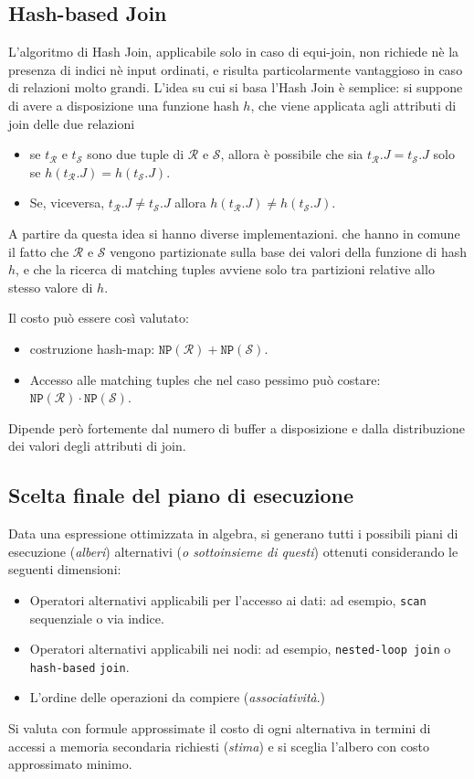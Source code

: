 \documentclass[oneside,a4paper,11pt]{book}
\theoremstyle{italicstyle}
\theoremstyle{normStyle}
\begin{document}
\subsection{Hash-based Join}
L'algoritmo di Hash Join, applicabile solo in caso di equi-join, non richiede nè la presenza di 
indici nè input ordinati, e risulta particolarmente vantaggioso in caso di relazioni molto grandi.
L'idea su cui si basa l'Hash Join è semplice:
si suppone di avere a disposizione una funzione hash $h$, che viene applicata agli attributi di join 
delle due relazioni
\begin{itemize}
  \item se $t_\mathcal{R}$ e $t_\mathcal{S}$ sono due tuple di $\mathcal{R}$ e 
  $\mathcal{S}$, allora è possibile che sia $t_\mathcal{R}.J = t_\mathcal{S}.J$
  solo se $h(t_\mathcal{R}.J) = h(t_\mathcal{S}.J)$.
  \item Se, viceversa, $t_\mathcal{R}.J \not= t_\mathcal{S}.J$
  allora $h(t_\mathcal{R}.J) \not= h(t_\mathcal{S}.J)$.
\end{itemize}
A partire da questa idea si hanno diverse implementazioni. che hanno in comune il fatto che $\mathcal{R}$ e 
$\mathcal{S}$ vengono partizionate sulla base dei valori della funzione di hash $h$, e che 
la ricerca di matching tuples avviene solo tra partizioni relative allo stesso valore di $h$.

Il costo può essere così valutato:
\begin{itemize}
  \item costruzione hash-map: $\texttt{NP}(\mathcal{R}) + \texttt{NP}(\mathcal{S})$.
  \item Accesso alle matching tuples che nel  caso pessimo può costare: $\texttt{NP}(\mathcal{R}) \cdot \texttt{NP}(\mathcal{S})$.
\end{itemize}
Dipende però fortemente dal numero di buffer a disposizione e dalla distribuzione dei valori degli attributi di join.
\subsection{Scelta finale del piano di esecuzione}
Data una espressione ottimizzata in algebra, si generano tutti i possibili piani di esecuzione (\textit{alberi}) 
alternativi (\textit{o sottoinsieme di questi}) ottenuti considerando le seguenti dimensioni:
\begin{itemize}
  \item Operatori alternativi applicabili per l'accesso ai dati: ad esempio, \verb|scan| sequenziale o via indice.
  \item Operatori alternativi applicabili nei nodi: ad esempio, \verb|nested-loop join| o \verb|hash-based| \verb|join|.
  \item L'ordine delle operazioni da compiere (\textit{associatività}.)
\end{itemize}
Si valuta con formule approssimate il costo di ogni alternativa in termini di accessi a 
memoria secondaria richiesti (\textit{stima}) e si sceglia l'albero con costo approssimato minimo.
\end{document}
